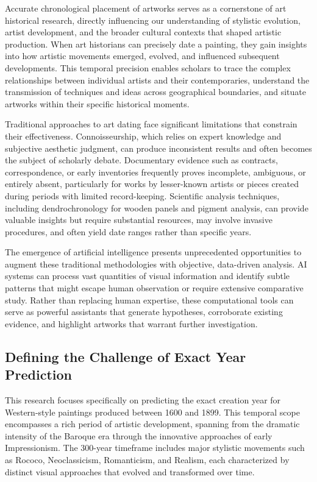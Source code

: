 \documentclass[10pt,twocolumn,letterpaper]{article}
\begin{document}
Accurate chronological placement of artworks serves as a cornerstone of art historical research, directly influencing our understanding of stylistic evolution, artist development, and the broader cultural contexts that shaped artistic production. When art historians can precisely date a painting, they gain insights into how artistic movements emerged, evolved, and influenced subsequent developments. This temporal precision enables scholars to trace the complex relationships between individual artists and their contemporaries, understand the transmission of techniques and ideas across geographical boundaries, and situate artworks within their specific historical moments.

Traditional approaches to art dating face significant limitations that constrain their effectiveness. Connoisseurship, which relies on expert knowledge and subjective aesthetic judgment, can produce inconsistent results and often becomes the subject of scholarly debate. Documentary evidence such as contracts, correspondence, or early inventories frequently proves incomplete, ambiguous, or entirely absent, particularly for works by lesser-known artists or pieces created during periods with limited record-keeping. Scientific analysis techniques, including dendrochronology for wooden panels and pigment analysis, can provide valuable insights but require substantial resources, may involve invasive procedures, and often yield date ranges rather than specific years.

The emergence of artificial intelligence presents unprecedented opportunities to augment these traditional methodologies with objective, data-driven analysis. AI systems can process vast quantities of visual information and identify subtle patterns that might escape human observation or require extensive comparative study. Rather than replacing human expertise, these computational tools can serve as powerful assistants that generate hypotheses, corroborate existing evidence, and highlight artworks that warrant further investigation.

\subsection{Defining the Challenge of Exact Year Prediction}

This research focuses specifically on predicting the exact creation year for Western-style paintings produced between 1600 and 1899. This temporal scope encompasses a rich period of artistic development, spanning from the dramatic intensity of the Baroque era through the innovative approaches of early Impressionism. The 300-year timeframe includes major stylistic movements such as Rococo, Neoclassicism, Romanticism, and Realism, each characterized by distinct visual approaches that evolved and transformed over time.
\end{document}
